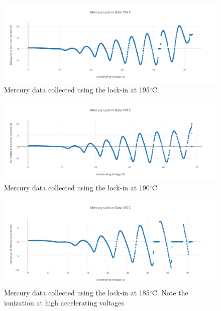 \documentclass[prb,preprint]{revtex4-1}
\begin{document}
\begin{figure}[h!]
\centering

\includegraphics[width=6in]{lockin_195.pdf}
\caption{Mercury data collected using the lock-in at 195$^{\circ}$C.}

\label{lockin_195}
\end{figure}


\begin{figure}[h!]
\centering

\includegraphics[width=6in]{lockin_190.pdf}
\caption{Mercury data collected using the lock-in at 190$^{\circ}$C.}

\label{lockin_190}
\end{figure}


\begin{figure}[h!]
\centering

\includegraphics[width=6in]{lockin_185.pdf}
\caption{Mercury data collected using the lock-in at 185$^{\circ}$C. Note the ionization at high accelerating voltages}

\label{lockin_185}
\end{figure}
\end{document}
